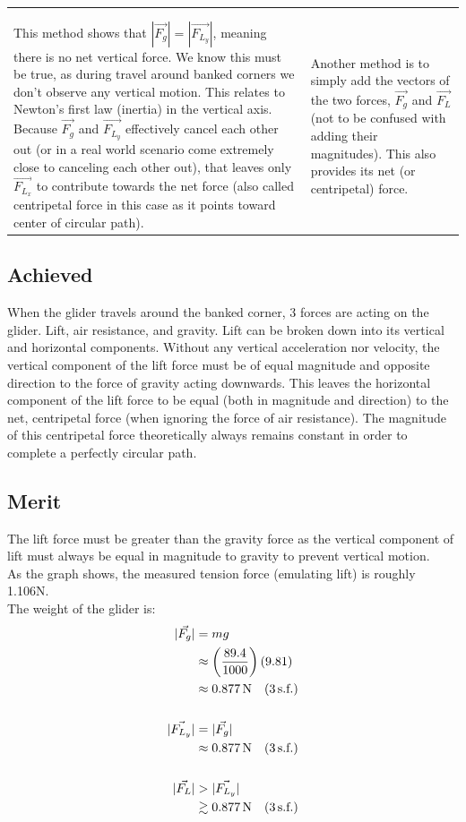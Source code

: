 \documentclass[11pt, a4paper]{article}
\begin{document}
\begin{table}[H]
\begin{tabularx}{\textwidth}{X|X}
{\begin{align}
				\end{align}
			}\\
			This method shows that $|\vec{F_g}|=|\vec{F_{L_y}}|$, meaning there is no net vertical force. We know this must be true, as during travel around banked corners we don't observe any vertical motion. This relates to Newton's first law (inertia) in the vertical axis.
			Because $\vec{F_g}$ and $\vec{F_{L_y}}$ effectively cancel each other out (or in a real world scenario come extremely close to canceling each other out), that leaves only $\vec{F_{L_x}}$ to contribute towards the net force (also called centripetal force in this case as it points toward center of circular path).
			&
			Another method is to simply add the vectors of the two forces, $\vec{F_g}$ and $\vec{F_L}$ (not to be confused with adding their magnitudes). This also provides its net (or centripetal) force.\\
		\end{tabularx}
	\end{table}
	
	\subsection{Achieved}
	
	When the glider travels around the banked corner, 3 forces are acting on the glider. Lift, air resistance, and gravity. Lift can be broken down into its vertical and horizontal components. Without any vertical acceleration nor velocity, the vertical component of the lift force must be of equal magnitude and opposite direction to the force of gravity acting downwards. This leaves the horizontal component of the lift force to be equal (both in magnitude and direction) to the net, centripetal force (when ignoring the force of air resistance). The magnitude of this centripetal force theoretically always remains constant in order to complete a perfectly circular path.
	\subsection{Merit}
	The lift force must be greater than the gravity force as the vertical component of lift must always be equal in magnitude to gravity to prevent vertical motion.\\
	As the graph shows, the measured tension force (emulating lift) is roughly 1.106N.\\%
	The weight of the glider is:
	\begin{align}
		|\vec{F_g}|&=mg\\
		&\approx \left(\frac{89.4}{1000}\right)(9.81)\\
		&\approx \SI{0.877}{\newton} \quad (3\, \text{s.f.})\\[\baselineskip]
		|\vec{F_{L_y}}|&=|\vec{F_g}|\\
		&\approx \SI{0.877}{\newton} \quad (3\, \text{s.f.})\\[\baselineskip]
		|\vec{F_L}|&>|\vec{F_{L_y}}|\\
		&\gtrsim\SI{0.877}{\newton} \quad (3\, \text{s.f.})
	\end{align}
	
\end{document}
